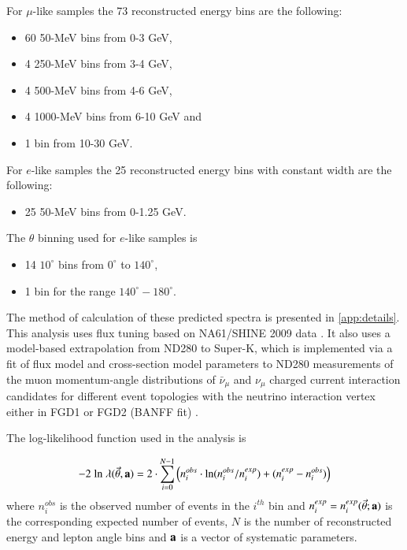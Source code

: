 For $\mu$-like samples the 73 reconstructed energy bins are the following:
\begin{itemize}
	\item   60 50-MeV bins from 0-3 GeV, 
	\item   4 250-MeV bins from 3-4 GeV, 
	\item   4 500-MeV bins from 4-6 GeV, 
	\item   4 1000-MeV bins from 6-10 GeV and
	\item   1 bin from 10-30 GeV.
\end{itemize}

For $e$-like samples the 25 reconstructed energy bins with constant width are the following:
\begin{itemize}
	\item   25 50-MeV bins from 0-1.25 GeV.
\end{itemize}

The $\theta$ binning used for $e$-like samples is
\begin{itemize}
	\item 14 $10^{\circ}$ bins from $0^{\circ}$ to $140^{\circ}$, 
	\item  1 bin for the range $140^{\circ} - 180^{\circ}$. 
\end{itemize}

The method of calculation of these predicted spectra is presented in \cref{app:details}. This analysis uses flux tuning based on NA61/SHINE 2009 data \cite{FluxTuning}\cite{NA61/SHINET2K}. It also uses a model-based extrapolation from ND280 to Super-K, which is implemented via a fit of flux model and cross-section model parameters to ND280 measurements of the muon momentum-angle distributions of $\bar{\nu}_\mu$ and  $\nu_\mu$ charged current interaction candidates for different event topologies with the neutrino interaction vertex either in FGD1 or FGD2 (BANFF fit) \cite{BANFF2017}.

The log-likelihood function used in the analysis is

\begin{equation} \label{eq:chisquare}
-2 \; \textrm{ln} \; \lambda (\vec{\theta},{\bf a}) = 2 \cdot \sum_{i=0}^{N-1} 
\Big( 
n^{obs}_{i} \cdot \textrm{ln} (n^{obs}_{i}/n^{exp}_{i}) +
(n^{exp}_{i}-n^{obs}_{i}) 
\Big) 
\end{equation}
where $n^{obs}_{i}$ is the observed number of events in the $i^{th}$ bin and $n^{exp}_{i} = n^{exp}_{i}(\vec{\theta}; {\bf a})$ is the corresponding expected number of events, $N$ is the number of reconstructed energy and lepton angle bins and ${\bf a}$ is a vector of systematic parameters.

